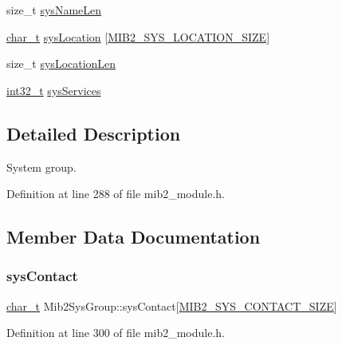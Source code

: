 \begin{DoxyCompactItemize}
\item 
size\+\_\+t \hyperlink{structMib2SysGroup_a3ca8f12063fe1842fc156a68639dc714}{sys\+Name\+Len}
\item 
\hyperlink{compiler__port_8h_a40bb5262bf908c328fbcfbe5d29d0201}{char\+\_\+t} \hyperlink{structMib2SysGroup_a491246f50a9ef79544e093fb24ab41b6}{sys\+Location} \mbox{[}\hyperlink{mib2__module_8h_a306cbd004278f136741a30eb626b0387}{M\+I\+B2\+\_\+\+S\+Y\+S\+\_\+\+L\+O\+C\+A\+T\+I\+O\+N\+\_\+\+S\+I\+ZE}\mbox{]}
\item 
size\+\_\+t \hyperlink{structMib2SysGroup_ad10d695586cf754348a270a204a1c549}{sys\+Location\+Len}
\item 
\hyperlink{stdint_8h_ab1967d8591af1a4e48c37fd2b0f184d0}{int32\+\_\+t} \hyperlink{structMib2SysGroup_a850b9d656996116ef8ece5606ad4b8bc}{sys\+Services}
\end{DoxyCompactItemize}


\subsection{Detailed Description}
System group. 

Definition at line 288 of file mib2\+\_\+module.\+h.



\subsection{Member Data Documentation}
\mbox{\label{structMib2SysGroup_a22d651637f98280f2d6e4e40d29d0dd1}} 
\subsubsection{\texorpdfstring{sys\+Contact}{sysContact}}
{\footnotesize\ttfamily \hyperlink{compiler__port_8h_a40bb5262bf908c328fbcfbe5d29d0201}{char\+\_\+t} Mib2\+Sys\+Group\+::sys\+Contact\mbox{[}\hyperlink{mib2__module_8h_abb92174837e66407111b11db4825cc70}{M\+I\+B2\+\_\+\+S\+Y\+S\+\_\+\+C\+O\+N\+T\+A\+C\+T\+\_\+\+S\+I\+ZE}\mbox{]}}



Definition at line 300 of file mib2\+\_\+module.\+h.

\mbox{\label{structMib2SysGroup_a69aa565a6eabca9e8c3bab2120d94eba}} 
